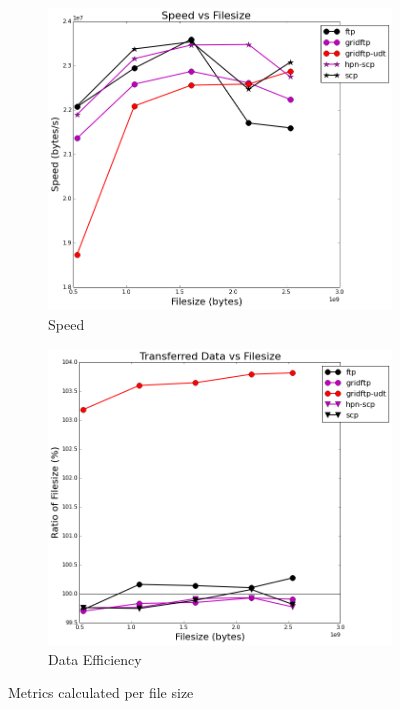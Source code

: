 \documentclass{sig-alternate-05-2015}
\begin{document}
\begin{figure}[h]
\centering
	\begin{subfigure}{.4\textwidth}
	\includegraphics[width=\textwidth]{img/per_filesize/speed.png}
	\caption{Speed}
	\label{fig:per_fs_speed}
	\end{subfigure}
	\begin{subfigure}{.4\textwidth}
	\includegraphics[width=\textwidth]{img/per_filesize/data.png}
	\caption{Data Efficiency}
	\label{fig:per_fs_data}
	\end{subfigure}
\caption{Metrics calculated per file size}
\label{fig:per_fs}
\end{figure}
\end{document}
